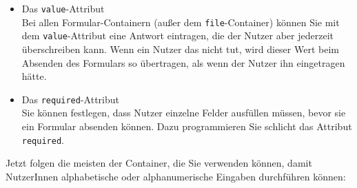\begin{itemize}
	\item Das \verb|value|-Attribut\\

	Bei allen Formular-Containern (außer dem \verb|file|-Container) können Sie mit dem \verb|value|-Attribut eine Antwort eintragen, die der Nutzer aber jederzeit überschreiben kann. Wenn ein Nutzer das nicht tut, wird dieser Wert beim Absenden des Formulars so übertragen, als wenn der Nutzer ihn eingetragen hätte.

	\item Das \verb|required|-Attribut\\

	Sie können festlegen, dass Nutzer einzelne Felder ausfüllen müssen, bevor sie ein Formular absenden können. Dazu programmieren Sie schlicht das Attribut \verb|required|.
\end{itemize}

Jetzt folgen die meisten der Container, die Sie verwenden können, damit NutzerInnen alphabetische oder alphanumerische Eingaben durchführen können:

